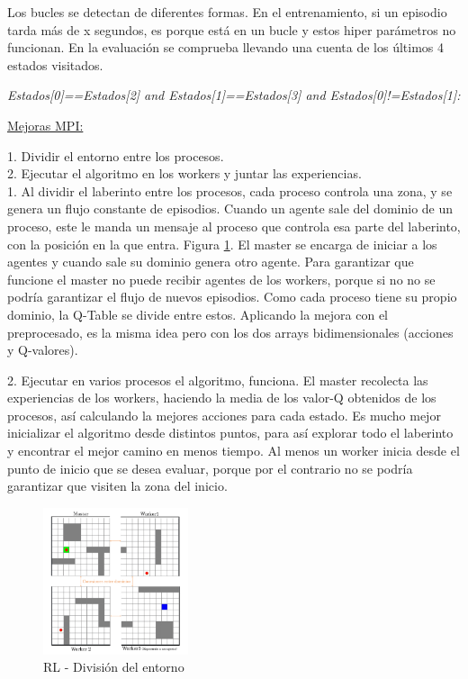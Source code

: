 	Los bucles se detectan de diferentes formas. En el entrenamiento, si un episodio tarda más de x segundos, es porque está en un bucle y estos hiper parámetros no funcionan. En la evaluación se comprueba llevando una cuenta de los últimos 4 estados visitados. 
	\begin{center}
		\textit{Estados[0]==Estados[2] and Estados[1]==Estados[3] and Estados[0]!=Estados[1]: }
	\end{center}
	
\underline{	Mejoras MPI:}
	
	1. Dividir el entorno entre los procesos. \\
	2. Ejecutar el algoritmo en los workers y juntar las experiencias.\\
	
	1. Al dividir el laberinto entre los procesos, cada proceso controla una zona, y se genera un flujo constante de episodios. Cuando un agente sale del dominio de un proceso, este le manda un mensaje al proceso que controla esa parte del laberinto, con la posición en la que entra. Figura \ref{fig:rlmpi}.
	El master se encarga de iniciar a los agentes y cuando sale su dominio genera otro agente. Para garantizar que funcione el master no puede recibir agentes de los workers, porque si no no se podría garantizar el flujo de nuevos episodios. 
	Como cada proceso tiene su propio dominio, la Q-Table se divide entre estos. Aplicando la mejora con el preprocesado, es la misma idea pero con los dos arrays bidimensionales (acciones y Q-valores). 
	
	2. Ejecutar en varios procesos el algoritmo, funciona. El master recolecta las experiencias de los workers, haciendo la media de los valor-Q obtenidos de los procesos, así calculando la mejores acciones para cada estado. Es mucho mejor inicializar el algoritmo desde distintos puntos, para así explorar todo el laberinto y encontrar el mejor camino en menos tiempo. Al menos un worker inicia desde el punto de inicio que se desea evaluar, porque por el contrario no se podría garantizar que visiten la zona del inicio.
	
	\newpage
	
	\begin{figure}[!h]
		\centering
		\includegraphics[width=0.38\textwidth]{images/chapter_3/rl_mpi}	
		\caption{RL - División del entorno}
		\label{fig:rlmpi}
	\end{figure}
	
